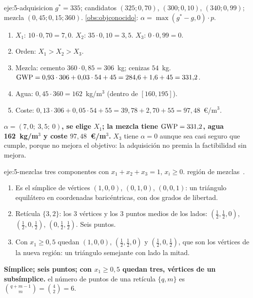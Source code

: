 \begin{solucion}{eje:5-adquisicion}
\datos $g^*=335$; candidatos $(325;0{,}70)$, $(300;0{,}10)$, $(340;0{,}99)$; mezcla $(0{,}45;0{,}15;360)$.
\planteamiento \cref{obs:objconocido}: $\alpha=\max(g^*-g,0)\cdot p$.
\pasos
\begin{enumerate}[label=\arabic*.]
  \item $X_1$: $10\cdot0{,}70=7{,}0$. $X_2$: $35\cdot0{,}10=3{,}5$. $X_3$: $0\cdot0{,}99=0$.
  \item Orden: $X_1>X_2>X_3$.
  \item Mezcla: cemento $360\cdot0{,}85=306$~kg; cenizas $54$~kg. $\mathrm{GWP}=0{,}93\cdot306+0{,}03\cdot54+45=284{,}6+1{,}6+45=331{,}2$.
  \item Agua: $0{,}45\cdot360=162$~kg/m$^3$ (dentro de $[160,195]$).
  \item Coste: $0{,}13\cdot306+0{,}05\cdot54+55=39{,}78+2{,}70+55=97{,}48$~€/m$^3$.
\end{enumerate}
\resultado \textbf{$\alpha=(7{,}0;\ 3{,}5;\ 0)$, se elige $X_1$; la mezcla tiene $\mathrm{GWP}=331{,}2$, agua 162~kg/m$^3$ y coste $97{,}48$~€/m$^3$.}
\comprobacion $X_3$ tiene $\alpha=0$ aunque sea casi seguro que cumple, porque no mejora el objetivo: la adquisición no premia la factibilidad sin mejora.
\end{solucion}

\begin{solucion}{eje:5-mezclas}
\datos tres componentes con $x_1+x_2+x_3=1$, $x_i\ge0$.
\planteamiento región de mezclas~\cite[§11.6]{montgomery}.
\pasos
\begin{enumerate}[label=(\alph*)]
  \item Es el símplice de vértices $(1,0,0)$, $(0,1,0)$, $(0,0,1)$: un triángulo equilátero en coordenadas baricéntricas, con dos grados de libertad.
  \item Retícula $\{3,2\}$: los 3 vértices y los 3 puntos medios de los lados: $(\tfrac12,\tfrac12,0)$, $(\tfrac12,0,\tfrac12)$, $(0,\tfrac12,\tfrac12)$. Seis puntos.
  \item Con $x_1\ge0{,}5$ quedan $(1,0,0)$, $(\tfrac12,\tfrac12,0)$ y $(\tfrac12,0,\tfrac12)$, que son los vértices de la nueva región: un triángulo semejante con lado la mitad.
\end{enumerate}
\resultado \textbf{Símplice; seis puntos; con $x_1\ge0{,}5$ quedan tres, vértices de un subsímplice.}
\comprobacion el número de puntos de una retícula $\{q,m\}$ es $\binom{q+m-1}{m}=\binom{4}{2}=6$.
\end{solucion}


